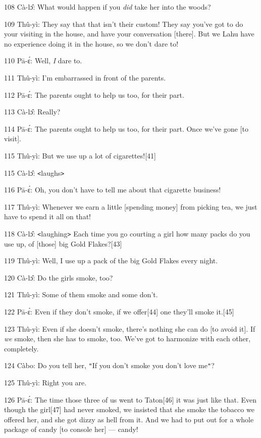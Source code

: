 {108 Cà-lɔ̂: What would happen if you }{\textit{did}}{
take her into the woods?}

{109 Thû-yì: They say that that isn't their custom! They say you've got
to do your visiting in the house, and have your conversation [there]. But we Lahu
have no experience doing it in the house, so we don't dare to! }

{110 Pā-ɛ́: Well,}{\textit{ I}}{ dare to.}

{111 Thû-yì: I'm embarrassed in front of the parents. }

{112 Pā-ɛ́: The parents ought to help us too, for their part.}

{113 Cà-lɔ̂: Really?}

{114 Pā-ɛ́: The parents ought to help us too, for their part. Once we've
gone [to visit].}

{115 Thû-yì: But we use up a lot of cigarettes![41]}

{115 Cà-lɔ̂: \texttt{<}laughs\texttt{>}}

{116 Pā-ɛ́: Oh, you don't have to tell me about that cigarette business!}

{117 Thû-yì: Whenever we earn a little [spending money] from picking tea,
we just have to spend it all on that!}

{118 Cà-lɔ̂: \texttt{<}laughing\texttt{>} Each time you go courting a
girl how many packs do you use up, of [those] big Gold Flakes?[43]}

{119 Thû-yì: Well, I use up a pack of the big Gold Flakes every night.}

{120 Cà-lɔ̂: Do the girls smoke, too?}

{121 Thû-yì: Some of them smoke and some don't.}

{122 Pā-ɛ́: Even if they don't smoke, if we offer[44] one they'll smoke
it.[45]}

{123 Thû-yì: Even if she doesn't smoke, there's nothing she can do [to
avoid it]. If }{\textit{we}}{ smoke, then she has to smoke, too.
We've got to harmonize with each other, completely. }

{124 Càbo: Do you tell her, \texttt{"}If you don't smoke you don't love
me\texttt{"}?}

{125 Thû-yì: Right you are.}

{126 Pā-ɛ́: The time those three of us went to Taton[46] it was just
like that. Even though the girl[47] had never smoked, we insisted that she smoke
the tobacco we offered her, and she got dizzy as hell from it. And we had to put
out for a whole package of candy [to console her] --- candy!}

